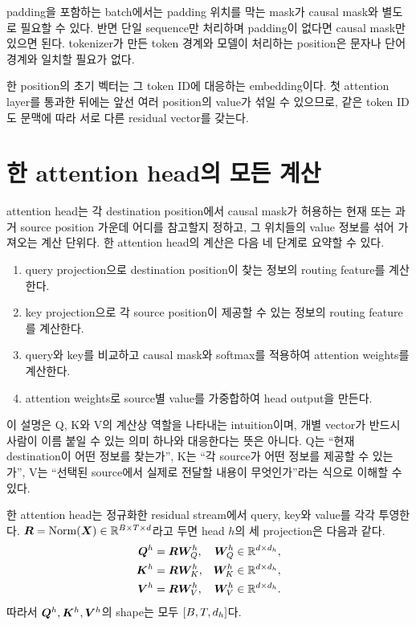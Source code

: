 padding을 포함하는 batch에서는 padding 위치를 막는 mask가 causal mask와 별도로 필요할 수 있다.
반면 단일 sequence만 처리하며 padding이 없다면 causal mask만 있으면 된다.
tokenizer가 만든 token 경계와 모델이 처리하는 position은 문자나 단어 경계와 일치할 필요가 없다.

\begin{factbox}
한 position의 초기 벡터는 그 token ID에 대응하는 embedding이다.
첫 attention layer를 통과한 뒤에는 앞선 여러 position의 value가 섞일 수 있으므로, 같은 token ID도 문맥에 따라 서로 다른 residual vector를 갖는다.
\end{factbox}

\section{한 attention head의 모든 계산}

attention head는 각 destination position에서 causal mask가 허용하는 현재 또는 과거 source position 가운데 어디를 참고할지 정하고, 그 위치들의 value 정보를 섞어 가져오는 계산 단위다.
한 attention head의 계산은 다음 네 단계로 요약할 수 있다.

\begin{enumerate}
  \item query projection으로 destination position이 찾는 정보의 routing feature를 계산한다.
  \item key projection으로 각 source position이 제공할 수 있는 정보의 routing feature를 계산한다.
  \item query와 key를 비교하고 causal mask와 softmax를 적용하여 attention weights를 계산한다.
  \item attention weights로 source별 value를 가중합하여 head output을 만든다.
\end{enumerate}

이 설명은 Q, K와 V의 계산상 역할을 나타내는 intuition이며, 개별 vector가 반드시 사람이 이름 붙일 수 있는 의미 하나와 대응한다는 뜻은 아니다.
Q는 ``현재 destination이 어떤 정보를 찾는가'', K는 ``각 source가 어떤 정보를 제공할 수 있는가'', V는 ``선택된 source에서 실제로 전달할 내용이 무엇인가''라는 식으로 이해할 수 있다.

한 attention head는 정규화한 residual stream에서 query, key와 value를 각각 투영한다.
$\bm{R}=\operatorname{Norm}(\bm{X})\in\mathbb{R}^{B\times T\times d}$라고 두면 head $h$의 세 projection은 다음과 같다.
\begin{align}
  \bm{Q}^{h}&=\bm{R}\bm{W}^{h}_{Q}, &
  \bm{W}^{h}_{Q}&\in\mathbb{R}^{d\times d_h},\\
  \bm{K}^{h}&=\bm{R}\bm{W}^{h}_{K}, &
  \bm{W}^{h}_{K}&\in\mathbb{R}^{d\times d_h},\\
  \bm{V}^{h}&=\bm{R}\bm{W}^{h}_{V}, &
  \bm{W}^{h}_{V}&\in\mathbb{R}^{d\times d_h}.
\end{align}
따라서 $\bm{Q}^{h},\bm{K}^{h},\bm{V}^{h}$의 shape는 모두 $\left[B,T,d_h\right]$다.

